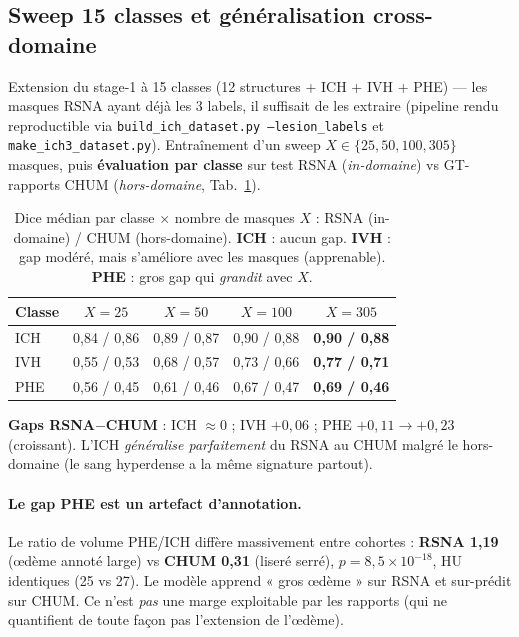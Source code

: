 \documentclass[11pt,a4paper]{article}
\begin{document}
\subsection{Sweep 15 classes et généralisation cross-domaine}
\label{sec:gen}
Extension du stage-1 à 15 classes (12 structures + ICH + IVH + PHE) --- les masques RSNA
ayant déjà les 3 labels, il suffisait de les extraire (pipeline rendu reproductible via
\texttt{build\_ich\_dataset.py --lesion\_labels} et \texttt{make\_ich3\_dataset.py}).
Entraînement d'un sweep $X\in\{25,50,100,305\}$ masques, puis \textbf{évaluation par classe}
sur test RSNA (\emph{in-domaine}) vs GT-rapports CHUM (\emph{hors-domaine},
Tab.~\ref{tab:gen}).

\begin{table}[h]\centering
\caption{Dice médian par classe $\times$ nombre de masques $X$ : RSNA (in-domaine) /
CHUM (hors-domaine). \textbf{ICH} : aucun gap. \textbf{IVH} : gap modéré, mais s'améliore
avec les masques (apprenable). \textbf{PHE} : gros gap qui \emph{grandit} avec $X$.}
\label{tab:gen}
\begin{tabular}{lcccc}
\toprule
Classe & $X{=}25$ & $X{=}50$ & $X{=}100$ & $X{=}305$ \\
\midrule
ICH & 0,84 / 0,86 & 0,89 / 0,87 & 0,90 / 0,88 & \textbf{0,90 / 0,88} \\
IVH & 0,55 / 0,53 & 0,68 / 0,57 & 0,73 / 0,66 & \textbf{0,77 / 0,71} \\
PHE & 0,56 / 0,45 & 0,61 / 0,46 & 0,67 / 0,47 & \textbf{0,69 / 0,46} \\
\bottomrule
\end{tabular}
\end{table}

\noindent\textbf{Gaps RSNA$-$CHUM} : ICH $\approx 0$ ; IVH $+0{,}06$ ; PHE $+0{,}11
\rightarrow +0{,}23$ (croissant). L'ICH \emph{généralise parfaitement} du RSNA au CHUM
malgré le hors-domaine (le sang hyperdense a la même signature partout).

\paragraph{Le gap PHE est un artefact d'annotation.} Le ratio de volume PHE/ICH diffère
massivement entre cohortes : \textbf{RSNA 1,19} (\oe dème annoté large) vs \textbf{CHUM 0,31}
(liseré serré), $p=8{,}5\times10^{-18}$, HU identiques (25 vs 27). Le modèle apprend
« gros \oe dème » sur RSNA et sur-prédit sur CHUM. Ce n'est \emph{pas} une marge exploitable
par les rapports (qui ne quantifient de toute façon pas l'extension de l'\oe dème).
\end{document}
